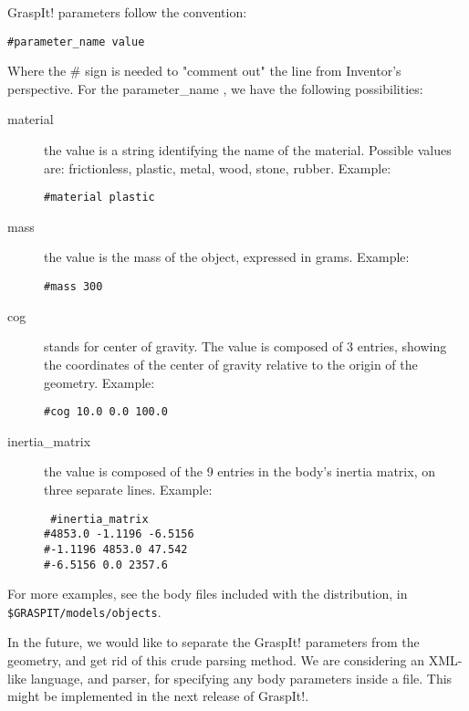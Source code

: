 GraspIt! parameters follow the convention: 

\texttt{\#parameter\_name value}

Where the \# sign is needed to "comment out" the line from Inventor's
perspective. For the parameter\_name , we have the following
possibilities:

\begin{description}
\item[material] the value is a string identifying the name of the
  material. Possible values are: frictionless, plastic, metal, wood,
  stone, rubber. Example:

\texttt{\#material plastic}

\item[mass] the value is the mass of the object, expressed in
  grams. Example:

\texttt{\#mass 300}

\item[cog] stands for center of gravity. The value is composed of 3
  entries, showing the coordinates of the center of gravity relative
  to the origin of the geometry. Example:

\texttt{\#cog 10.0 0.0 100.0}

\item[inertia\_matrix] the value is composed of the 9 entries in the
  body's inertia matrix, on three separate lines. Example:

\texttt{
\#inertia\_matrix\\
\#4853.0     -1.1196 -6.5156\\
\#-1.1196    4853.0  47.542\\
\#-6.5156    0.0     2357.6
}
\end{description}

For more examples, see the body files included with the distribution,
in \texttt{\$GRASPIT/models/objects}.

In the future, we would like to separate the GraspIt! parameters
from the geometry, and get rid of this crude parsing method. We are
considering an XML-like language, and parser, for specifying any body
parameters inside a file. This might be implemented in the next
release of GraspIt!.

